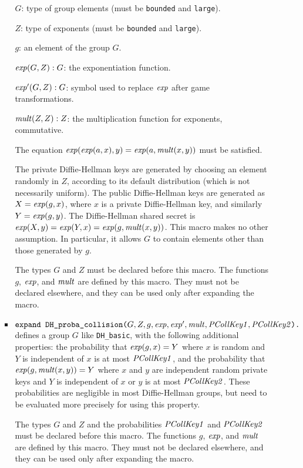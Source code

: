 \documentclass{article}
\begin{document}
\begin{itemize}
\begin{itemize}
\begin{itemize}
       $G$: type of group elements (must be \texttt{bounded} and \texttt{large}).

       $Z$: type of exponents (must be \texttt{bounded} and
       \texttt{large}). 
       
       $g$: an element of the group $G$.

       $\mathit{exp}(G, Z): G$: the exponentiation function.  
       
       $\mathit{exp}'(G, Z): G$: symbol used to replace $\mathit{exp}$ after game transformations.

       $\mathit{mult}(Z, Z): Z$: the multiplication function for exponents, commutative.

       The equation $\mathit{exp}(\mathit{exp}(a,x), y) = \mathit{exp}(a,
       \mathit{mult}(x,y))$ must be satisfied.

       The private Diffie-Hellman keys are generated by choosing an
       element randomly in $Z$, according to its default distribution
       (which is not necessarily uniform). The public Diffie-Hellman
       keys are generated as $X = \mathit{exp}(g,x)$, where $x$ is a
       private Diffie-Hellman key, and similarly $Y =
       \mathit{exp}(g,y)$. The Diffie-Hellman shared secret is
       $\mathit{exp}(X,y) = \mathit{exp}(Y,x) = \mathit{exp}(g,\mathit{mult}(x,y))$.
       This macro makes no other assumption. In particular, it allows
       $G$ to contain elements other than those generated by $g$.

       The types $G$ and $Z$ must be declared before this macro.  The
       functions $g$, $\mathit{exp}$, and $\mathit{mult}$ are defined by this
       macro. They must not be declared elsewhere, and they can be used
       only after expanding the macro.

     \item $\texttt{expand\ DH\_proba\_collision(}G, Z, g, \vn{exp},
       \vn{exp}', \vn{mult}, \vn{PCollKey1},
       \vn{PCollKey2}\texttt{).}$ defines a group $G$ like
       \texttt{DH\_basic}, with the following additional properties:
       the probability that $\mathit{exp}(g, x) = Y$ where $x$ is random and
       $Y$ is independent of $x$ is at most $\mathit{PCollKey1}$, and
       the probability that $\mathit{exp}(g, \mathit{mult}(x,y)) = Y$ where
       $x$ and $y$ are independent random private keys and 
       $Y$ is independent of $x$ or $y$ is at most
       $\mathit{PCollKey2}$. These probabilities are negligible in most
       Diffie-Hellman groups, but need to be evaluated more precisely
       for using this property.
       
       The types $G$ and $Z$ and the probabilities $\mathit{PCollKey1}$
       and $\mathit{PCollKey2}$ must be declared before this macro.  The
       functions $g$, $\mathit{exp}$, and $\mathit{mult}$ are defined by this
       macro. They must not be declared elsewhere, and they can be
       used only after expanding the macro.


\end{itemize}
\end{itemize}
\end{itemize}
\end{document}
